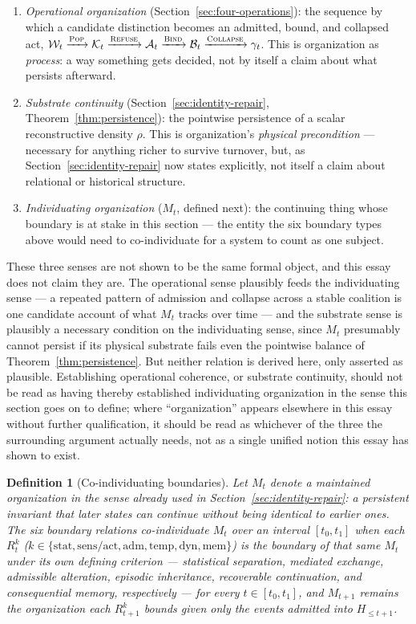 \documentclass[11pt]{article}
\newcommand{\Pop}{\textsc{Pop}}
\newcommand{\Refuse}{\textsc{Refuse}}
\newcommand{\Bind}{\textsc{Bind}}
\newcommand{\Collapse}{\textsc{Collapse}}
\newtheorem{definition}{Definition}
\begin{document}
\begin{enumerate}
\item \emph{Operational organization} (Section~\ref{sec:four-operations}): the sequence by which a candidate distinction becomes an admitted, bound, and collapsed act, $\mathcal{W}_t\xrightarrow{\Pop}\mathcal{K}_t\xrightarrow{\Refuse}\mathcal{A}_t\xrightarrow{\Bind}\mathcal{B}_t\xrightarrow{\Collapse}\gamma_t$. This is organization as \emph{process}: a way something gets decided, not by itself a claim about what persists afterward.
\item \emph{Substrate continuity} (Section~\ref{sec:identity-repair}, Theorem~\ref{thm:persistence}): the pointwise persistence of a scalar reconstructive density $\rho$. This is organization's \emph{physical precondition} --- necessary for anything richer to survive turnover, but, as Section~\ref{sec:identity-repair} now states explicitly, not itself a claim about relational or historical structure.
\item \emph{Individuating organization} ($M_t$, defined next): the continuing thing whose boundary is at stake in this section --- the entity the six boundary types above would need to co-individuate for a system to count as one subject.
\end{enumerate}

These three senses are not shown to be the same formal object, and this essay does not claim they are. The operational sense plausibly feeds the individuating sense --- a repeated pattern of admission and collapse across a stable coalition is one candidate account of what $M_t$ tracks over time --- and the substrate sense is plausibly a necessary condition on the individuating sense, since $M_t$ presumably cannot persist if its physical substrate fails even the pointwise balance of Theorem~\ref{thm:persistence}. But neither relation is derived here, only asserted as plausible. Establishing operational coherence, or substrate continuity, should not be read as having thereby established individuating organization in the sense this section goes on to define; where ``organization'' appears elsewhere in this essay without further qualification, it should be read as whichever of the three the surrounding argument actually needs, not as a single unified notion this essay has shown to exist.

\begin{definition}[Co-individuating boundaries]
Let $M_t$ denote a maintained organization in the sense already used in Section~\ref{sec:identity-repair}: a persistent invariant that later states can continue without being identical to earlier ones. The six boundary relations \emph{co-individuate} $M_t$ over an interval $[t_0,t_1]$ when each $R^k_t$ ($k\in\{\mathrm{stat},\mathrm{sens/act},\mathrm{adm},\mathrm{temp},\mathrm{dyn},\mathrm{mem}\}$) is the boundary of that same $M_t$ under its own defining criterion --- statistical separation, mediated exchange, admissible alteration, episodic inheritance, recoverable continuation, and consequential memory, respectively --- for every $t\in[t_0,t_1]$, and $M_{t+1}$ remains the organization each $R^k_{t+1}$ bounds given only the events admitted into $H_{\leq t+1}$.
\end{definition}
\end{document}
